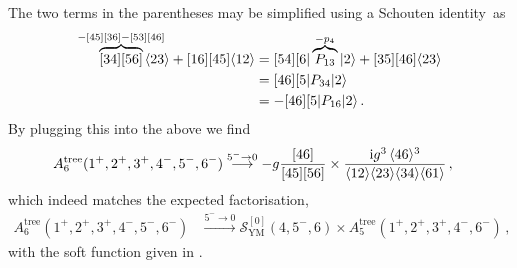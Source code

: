 %
The two terms in the parentheses may be simplified using a Schouten identity~as
%
\begin{align}
 \overbrace{\bev{34}\bev{56}}^{-\bev{45}\bev{36}-\bev{53}\bev{46}} \hspace{-0.5cm} \vev{23}
 + \bev{16}\bev{45} \vev{12} & = \bev{54}[6|\overbrace{P_{13}}^{-p_{4}}|2\rangle + \bev{35}\bev{46}\vev{23} \nonumber \\
& = \bev{46}[5|P_{34}|2\rangle \nonumber \\
& = - \bev{46}[5|P_{16}|2\rangle\, .
\end{align}
%
By plugging this into the above we find
%
\begin{align}
A_{6}^{\text{tree}}(1^{+}, 2^{+}, 3^{+}, 4^{-}, 5^{-}, 6^{-})  &\stackrel{5^{-}\to 0}{\longrightarrow}
- g \frac{[46]}{[45][56]}  \times \frac{\mathrm{i} g^3 \, \langle46\rangle^{3}}{\langle12\rangle\langle23\rangle\langle34\rangle
\langle61\rangle}  \,,
\end{align}
%
which indeed matches the expected factorisation,
\begin{align}
A_{6}^{\text{tree}}(1^{+}, 2^{+}, 3^{+}, 4^{-}, 5^{-}, 6^{-})  &\stackrel{5^{-}\to 0}{\longrightarrow} \mathcal{S}^{[0]}_{\text{YM}}(4,5^{-},6) \times A_{5}^{\text{tree}}(1^{+}, 2^{+}, 3^{+}, 4^{-}, 6^{-})\,,
\end{align}
with the soft function given in .



